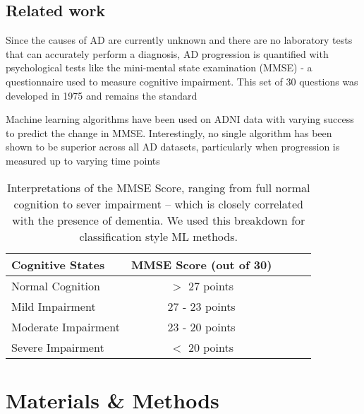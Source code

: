 \documentclass{article}
\begin{document}
\subsection{Related work} Since the causes of AD are currently unknown and there are no laboratory tests that can accurately perform a diagnosis, AD progression is quantified with psychological tests like the mini-mental state examination (MMSE) - a questionnaire used to measure cognitive impairment. This set of 30 questions was developed in 1975 and remains the standard \cite{carolan07}

Machine learning algorithms have been used on ADNI data with varying success to predict the change in MMSE. Interestingly, no single algorithm has been shown to be superior across all AD datasets, particularly when progression is measured up to varying time points \cite{umer11}

\begin{flushleft}
\begin{table}[h]
\caption{Interpretations of the MMSE Score, ranging from full normal cognition to sever impairment -- which is closely correlated with the presence of dementia. We used this breakdown for classification style ML methods.}
\label{sample-table}
\vskip 0.15in
\begin{center}
\begin{small}
\begin{sc}
\begin{tabular}{lcccr}
\hline
\abovespace
\belowspace
Cognitive States & MMSE Score (out of 30) \\
\hline
\abovespace
\belowspace
Normal Cognition    & $>$ 27 points \\
\belowspace
Mild Impairment & 27 - 23 points  \\
\belowspace
Moderate Impairment    &  23 - 20 points  \\
\belowspace

Severe Impairment     &  $<$ 20 points  \\

\hline
\end{tabular}
\end{sc}
\end{small}
\end{center}
\vskip -0.1in
\end{table}

\end{flushleft}

\section{Materials \& Methods}
\end{document}
